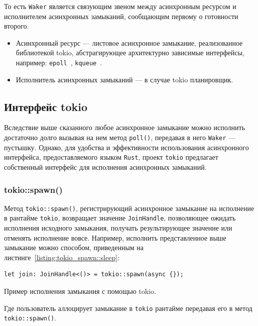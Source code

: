 То есть \verb|Waker| является связующим звеном между асинхронным ресурсом и исполнителем асинхронных замыканий, сообщающим первому о готовности второго.

\begin{itemize}
    \item Асинхронный ресурс --- листовое асинхронное замыкание, реализованное библиотекой tokio, абстрагирующее архитектурно зависимые интерфейсы, например: \verb|epoll|~\cite{epollLib}, \verb|kqueue|~\cite{kqueue}.
    \item Исполнитель асинхронных замыканий --- в случае tokio планировщик.
\end{itemize}

\subsection{Интерфейс tokio}

Вследствие выше сказанного любое асинхронное замыкание можно исполнить достаточно долго вызывая на нем метод \verb|poll()|, передавая в него \verb|Waker| --- пустышку. Однако, для удобства и эффективности использования асинхронного интерфейса, предоставляемого языком \verb|Rust|, проект \verb|tokio| предлагает собственный интерфейс для исполнения асинхронных замыканий.

\subsubsection{tokio::spawn()}

Метод \verb|tokio::spawn()|, регистрирующий асинхронное замыкание на исполнение в рантайме \verb|tokio|, возвращает значение \verb|JoinHandle|, позволяющее ожидать исполнения исходного замыкания, получать результирующее значение или отменять исполнение вовсе. Например, исполнить представленное выше замыкание можно способом, приведенным на листинге~\ref{listing:tokio_spawn::sleep}:

\begin{listing}[H]
    \begin{verbatim}
let join: JoinHandle<()> = tokio::spawn(async {});
    \end{verbatim}

    \caption{Пример исполнения замыкания с помощью tokio.}
    \label{listing:tokio_spawn::sleep}
\end{listing}

Где пользователь аллоцирует замыкание в \verb|tokio| рантайме передавая его в метод \verb|tokio::spawn()|.

